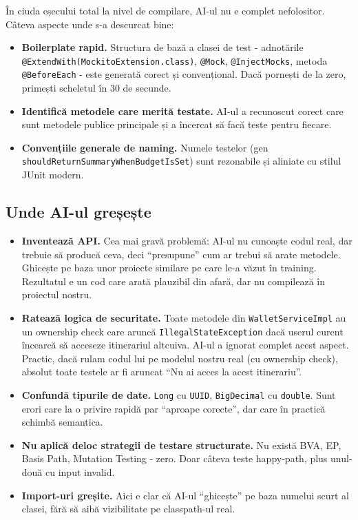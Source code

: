 În ciuda eșecului total la nivel de compilare, AI-ul nu e complet nefolositor. Câteva aspecte unde s-a descurcat bine:

\begin{itemize}
    \item \textbf{Boilerplate rapid.} Structura de bază a clasei de test - adnotările \texttt{@ExtendWith(MockitoExtension.class)}, \texttt{@Mock}, \texttt{@InjectMocks}, metoda \texttt{@BeforeEach} - este generată corect și convențional. Dacă pornești de la zero, primești scheletul în 30 de secunde.

    \item \textbf{Identifică metodele care merită testate.} AI-ul a recunoscut corect care sunt metodele publice principale și a încercat să facă teste pentru fiecare.

    \item \textbf{Convențiile generale de naming.} Numele testelor (gen \texttt{shouldReturnSummaryWhenBudgetIsSet}) sunt rezonabile și aliniate cu stilul JUnit modern.
\end{itemize}

\subsection{Unde AI-ul greșește}

\begin{itemize}
    \item \textbf{Inventează API.} Cea mai gravă problemă: AI-ul nu cunoaște codul real, dar trebuie să producă ceva, deci \enquote{presupune} cum ar trebui să arate metodele. Ghicește pe baza unor proiecte similare pe care le-a văzut în training. Rezultatul e un cod care arată plauzibil din afară, dar nu compilează în proiectul nostru.

    \item \textbf{Ratează logica de securitate.} Toate metodele din \texttt{WalletServiceImpl} au un ownership check care aruncă \texttt{IllegalStateException} dacă userul curent încearcă să acceseze itinerariul altcuiva. AI-ul a ignorat complet acest aspect. Practic, dacă rulam codul lui pe modelul nostru real (cu ownership check), absolut toate testele ar fi aruncat \enquote{Nu ai acces la acest itinerariu}.

    \item \textbf{Confundă tipurile de date.} \texttt{Long} cu \texttt{UUID}, \texttt{BigDecimal} cu \texttt{double}. Sunt erori care la o privire rapidă par \enquote{aproape corecte}, dar care în practică schimbă semantica.

    \item \textbf{Nu aplică deloc strategii de testare structurate.} Nu există BVA, EP, Basis Path, Mutation Testing - zero. Doar câteva teste happy-path, plus unul-două cu input invalid.

    \item \textbf{Import-uri greșite.} Aici e clar că AI-ul \enquote{ghicește} pe baza numelui scurt al clasei, fără să aibă vizibilitate pe classpath-ul real.
\end{itemize}


